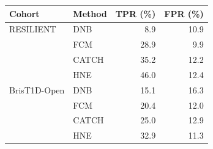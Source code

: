 \begin{tabular*}{\linewidth}{@{\extracolsep{\fill}}llrr@{}}
\toprule
Cohort & Method & TPR (\%) & FPR (\%) \\
\midrule
RESILIENT & DNB & 8.9 & 10.9 \\
 & FCM & 28.9 & 9.9 \\
 & CATCH & 35.2 & 12.2 \\
 & HNE & 46.0 & 12.4 \\
BrisT1D-Open & DNB & 15.1 & 16.3 \\
 & FCM & 20.4 & 12.0 \\
 & CATCH & 25.0 & 12.9 \\
 & HNE & 32.9 & 11.3 \\
\bottomrule
\end{tabular*}